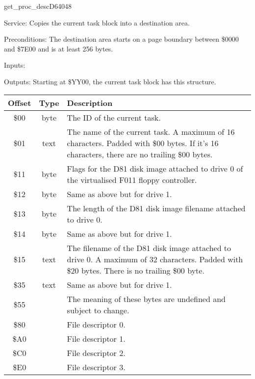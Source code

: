 \begin{hyppotrap}{get\_proc\_desc}{D640}{48}
\item [Service:]
  Copies the current task block into a destination area.
\item [Preconditions:]
  The destination area starts on a page boundary between \$0000 and \$7E00 and
  is at least 256 bytes.
\item [Inputs:]
\item [Outputs:]
  Starting at \$YY00, the current task block has this structure.
  {\setlength{\tabcolsep}{2mm}
  \begin{tabular}{|c|c|p{6.9cm}|}
  \hline
  \textbf{Offset} & \textbf{Type} & \textbf{Description}
  \\\hline
  \$00 & byte & The ID of the current task.
  \\
  \$01 & text & The name of the current task. A maximum of 16 characters.
                Padded with \$00 bytes.
                If it's 16 characters, there are no trailing \$00 bytes.
  \\
  \$11 & byte & Flags for the D81 disk image attached to drive 0 of the
                virtualised F011 floppy controller.
  \\
  \$12 & byte & Same as above but for drive 1.
  \\
  \$13 & byte & The length of the D81 disk image filename attached to drive 0.
  \\
  \$14 & byte & Same as above but for drive 1.
  \\
  \$15 & text & The filename of the D81 disk image attached to drive 0.
                A maximum of 32 characters. Padded with \$20 bytes.
                There is no trailing \$00 byte.
  \\
  \$35 & text & Same as above but for drive 1.
  \\
  \$55 & & The meaning of these bytes are undefined and subject to change.
  \\
  \$80 & & File descriptor 0.
  \\
  \$A0 & & File descriptor 1.
  \\
  \$C0 & & File descriptor 2.
  \\
  \$E0 & & File descriptor 3.
  \\\hline
  \end{tabular}
  }


\end{hyppotrap}
